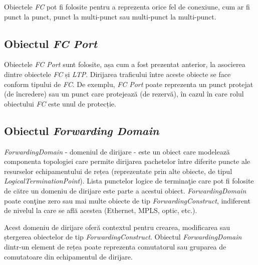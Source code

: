 Obiectele \textit{FC} pot fi folosite pentru a reprezenta orice fel de conexiune, cum ar fi punct la punct, punct la multi-punct sau multi-punct la multi-punct.

\subsection{Obiectul \textit{FC Port}}

Obiectele \textit{FC Port} sunt folosite, așa cum a fost prezentat anterior, la asocierea dintre obiectele \textit{FC} și \textit{LTP}. Dirijarea traficului între aceste obiecte se face conform tipului de \textit{FC}. De exemplu, \textit{FC Port} poate reprezenta un punct protejat (de încredere) sau un punct care protejează (de rezervă), în cazul în care rolul obiectului \textit{FC} este unul de protecție.

\subsection{Obiectul \textit{Forwarding Domain}}

\textit{ForwardingDomain} - domeniul de dirijare - este un obiect care modelează componenta topologiei care permite dirijarea pachetelor între diferite puncte ale resurselor echipamentului de rețea (reprezentate prin alte obiecte, de tipul \textit{LogicalTerminationPoint}). Lista punctelor logice de terminaţie care pot fi folosite de către un domeniu de dirijare este parte a acestui obiect. \textit{ForwardingDomain} poate conţine zero sau mai multe obiecte de tip \textit{ForwardingConstruct}, indiferent de nivelul la care se află acestea (Ethernet, MPLS, optic, etc.). 

Acest domeniu de dirijare oferă contextul pentru crearea, modificarea sau ștergerea obiectelor de tip \textit{ForwardingConstruct}. Obiectul \textit{ForwardingDomain} dintr-un element de rețea poate reprezenta comutatorul sau gruparea de comutatoare din echipamentul de dirijare.

